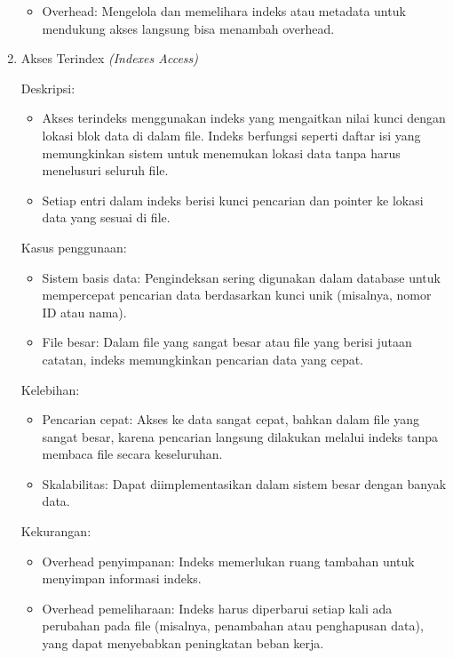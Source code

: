 \documentclass[12pt]{article}
\begin{document}
\begin{enumerate}
\begin{itemize}
        \item Overhead: Mengelola dan memelihara indeks atau metadata untuk mendukung akses langsung bisa menambah overhead.

    \end{itemize}



\item  Akses Terindex \textit{(Indexes Access)}

    {Deskripsi:}
    \begin{itemize}
        \item Akses terindeks menggunakan indeks yang mengaitkan nilai kunci dengan lokasi blok data di dalam file. Indeks berfungsi seperti daftar isi yang memungkinkan sistem untuk menemukan lokasi data tanpa harus menelusuri seluruh file.

        \item Setiap entri dalam indeks berisi kunci pencarian dan pointer ke lokasi data yang sesuai di file.
    \end{itemize}

    {Kasus penggunaan:}
     \begin{itemize}
        \item Sistem basis data: Pengindeksan sering digunakan dalam database untuk mempercepat pencarian data berdasarkan kunci unik (misalnya, nomor ID atau nama).

        \item File besar: Dalam file yang sangat besar atau file yang berisi jutaan catatan, indeks memungkinkan pencarian data yang cepat.

    \end{itemize}

    {Kelebihan:}
     \begin{itemize}
        \item Pencarian cepat: Akses ke data sangat cepat, bahkan dalam file yang sangat besar, karena pencarian langsung dilakukan melalui indeks tanpa membaca file secara keseluruhan.

        \item Skalabilitas: Dapat diimplementasikan dalam sistem besar dengan banyak data.

    \end{itemize}

    {Kekurangan:}
     \begin{itemize}
        \item Overhead penyimpanan: Indeks memerlukan ruang tambahan untuk menyimpan informasi indeks.
        
        \item Overhead pemeliharaan: Indeks harus diperbarui setiap kali ada perubahan pada file (misalnya, penambahan atau penghapusan data), yang dapat menyebabkan peningkatan beban kerja.

    \end{itemize}

\end{enumerate}
\end{document}
